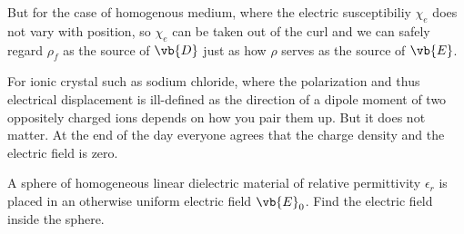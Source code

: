 \documentclass[english,a4paper,12pt]{report}
\begin{document}
But for the case of homogenous medium, where the electric susceptibiliy \(\chi _{e} \) does not vary with position, so \(\chi _{e} \) can be taken out of the curl and we can safely regard \(\rho _{f} \) as the source of \(\vb{D} \) just as how \(\rho \) serves as the source of \(\vb{E} \).        

For ionic crystal such as sodium chloride, where the polarization and thus electrical displacement is ill-defined as the direction of a dipole moment of two oppositely charged ions depends on how you pair them up. But it does not matter. At the end of the day everyone agrees that the charge density and the electric field is zero.  

{A sphere of homogeneous linear dielectric material of relative permittivity \(\epsilon _{r} \) is placed in an otherwise uniform electric field \(\vb{E} _{0} \). Find the electric field inside the sphere.}
\end{document}
